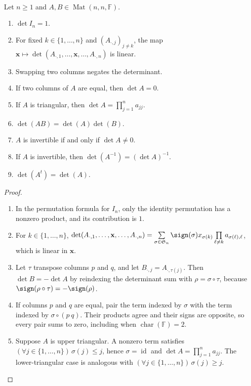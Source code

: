 \begin{theorem} \label{thm:determinant-basic-laws} \\
Let $n\geq1$ and $A,B\in\operatorname{Mat}(n,n,\mathbb{F})$.
\begin{enumerate}[label=(\roman*)]
\setlength{\itemsep}{0pt}
\item $\det I_n=1$.
\item For fixed $k\in\{1,\ldots,n\}$ and $(A_{\cdot,j})_{j\neq k}$, the map $\mathbf{x}\mapsto\det(A_{\cdot,1},\ldots,\mathbf{x},\ldots,A_{\cdot,n})$ is linear.
\item Swapping two columns negates the determinant.
\item If two columns of $A$ are equal, then $\det A=0$.
\item If $A$ is triangular, then $\det A=\prod\limits_{j=1}^{n}a_{jj}$.
\item $\det(AB)=\det(A)\det(B)$.
\item $A$ is invertible if and only if $\det A\neq0$.
\item If $A$ is invertible, then $\det(A^{-1})=(\det A)^{-1}$.
\item $\det(A^t)=\det(A)$.
\end{enumerate}
\begin{proof}
\begin{enumerate}[label=(\roman*)]
\setlength{\itemsep}{0pt}
\item[$(i)$] In the permutation formula for $I_n$, only the identity permutation has a nonzero product, and its contribution is $1$.
\item[$(ii)$] For $k\in\{1,\ldots,n\}$, $\det(A_{\cdot,1},\ldots,\mathbf{x},\ldots,A_{\cdot,n})=\sum\limits_{\sigma\in\mathfrak{S}_n}\sign(\sigma)x_{\sigma(k)}\prod\limits_{\ell\neq k}a_{\sigma(\ell),\ell}$, which is linear in $\mathbf{x}$.
\item[$(iii)$] Let $\tau$ transpose columns $p$ and $q$, and let $B_{\cdot,j}=A_{\cdot,\tau(j)}$. Then $\det B=-\det A$ by reindexing the determinant sum with $\rho=\sigma\circ\tau$, because $\sign(\rho\circ\tau)=-\sign(\rho)$.
\item[$(iv)$] If columns $p$ and $q$ are equal, pair the term indexed by $\sigma$ with the term indexed by $\sigma\circ(p\ q)$. Their products agree and their signs are opposite, so every pair sums to zero, including when $\operatorname{char}(\mathbb{F})=2$.
\item[$(v)$] Suppose $A$ is upper triangular. A nonzero term satisfies $(\forall j\in\{1,\ldots,n\})\,\sigma(j)\leq j$, hence $\sigma=\operatorname{id}$ and $\det A=\prod\limits_{j=1}^{n}a_{jj}$. The lower-triangular case is analogous with $(\forall j\in\{1,\ldots,n\})\,\sigma(j)\geq j$.

\end{enumerate}
\end{proof}
\end{theorem}

